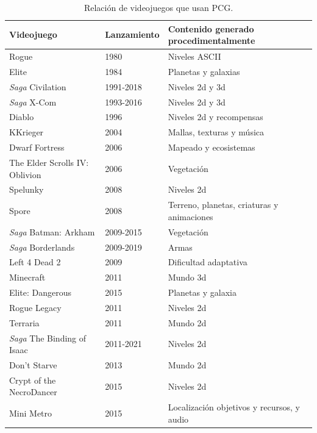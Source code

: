 \begin{table}[H]
    \centering
    \caption{Relación de videojuegos que usan PCG.}
    \begin{tabular}{|l|l|l|}
    \hline
    Videojuego & Lanzamiento & Contenido generado procedimentalmente \\ \hline
    Rogue      & 1980        & Niveles ASCII  \\ \hline
    Elite      & 1984        &     Planetas y galaxias   \\ \hline
    \textit{Saga} Civilation     & 1991-2018        & Niveles \acrshort{2d} y \acrshort{3d}   \\ \hline
    \textit{Saga} X-Com     & 1993-2016        &  Niveles \acrshort{2d} y \acrshort{3d}  \\ \hline
    Diablo     & 1996        & Niveles \acrshort{2d} y recompensas     \\ \hline
    KKrieger     & 2004        & Mallas, texturas y música     \\ \hline
    Dwarf Fortress & 2006 & Mapeado y ecosistemas \\ \hline
    The Elder Scrolls IV: Oblivion     & 2006        & Vegetación     \\ \hline
    Spelunky     & 2008        & Niveles \acrshort{2d}  \\ \hline
    Spore     & 2008        & Terreno, planetas, criaturas y animaciones \\ \hline
    \textit{Saga} Batman: Arkham     & 2009-2015        & Vegetación   \\ \hline
    \textit{Saga} Borderlands     & 2009-2019        & Armas   \\ \hline
    Left 4 Dead 2     & 2009        & Dificultad adaptativa   \\ \hline
    Minecraft     & 2011        & Mundo \acrshort{3d}      \\ \hline
    Elite: Dangerous     & 2015        & Planetas y galaxia \\ \hline
    Rogue Legacy &	2011 & Niveles \acrshort{2d} \\ \hline
    Terraria &	2011 & Mundo \acrshort{2d} \\ \hline
    \textit{Saga} The Binding of Isaac &	2011-2021 & Niveles \acrshort{2d}  \\ \hline
    Don't Starve &	2013 & Mundo \acrshort{2d} \\ \hline
    Crypt of the NecroDancer &	2015 & Niveles \acrshort{2d} \\ \hline
    Mini Metro &	2015 & Localización objetivos y recursos, y audio \\ \hline

\end{tabular}
\end{table}
